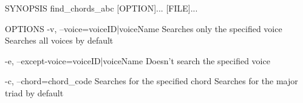 SYNOPSIS
  find_chords_abc [OPTION]... [FILE]...

OPTIONS
  -v, --voice=voiceID|voiceName
    Searches only the specified voice
    Searches all voices by default

  -e, --except-voice=voiceID|voiceName
    Doesn't search the specified voice

  -c, --chord=chord_code
    Searches for the specified chord
    Searches for the major triad by default
